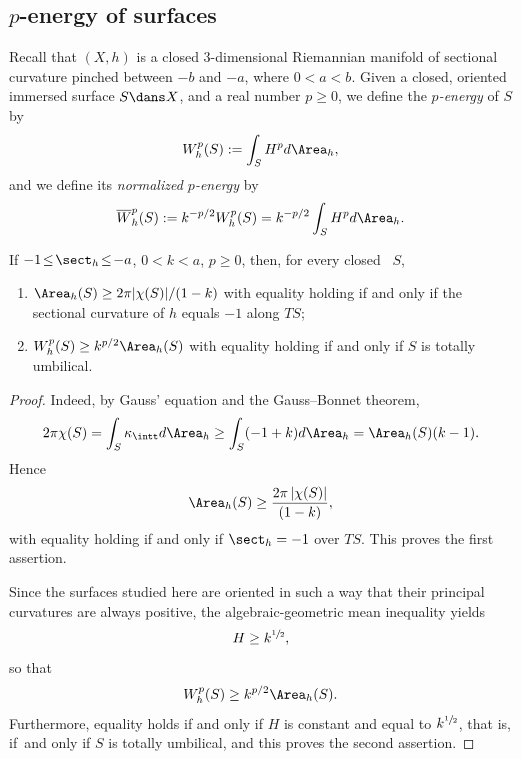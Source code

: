 \subsection{$p$-energy of surfaces} Recall that $(X,h)$ is a closed $3$\nobreakdash-dimensional Riemannian manifold of sectional curvature pinched between $-b$ and $-a$, where $0<a<b$. Given a closed, oriented immersed surface $S\dans X$, and a real number $p\geq 0$, we define the \emph{$p$-energy} of $S$ by
\begin{equation*}
W_h^{p}(S):=\int_S H^p d\Area_h,
\end{equation*}
and we define its \emph{normalized $p$-energy} by
\begin{equation*}
\overline{W}_h^{p}(S):=k^{-p/2}W_h^p(S)=k^{-p/2}\int_S H^p d\Area_h.
\end{equation*}

\begin{lemma}\label{lem_lower_bounds_energy}
If $-1\!\leq\!\sect_h\!\leq\! -a$, $0\!<\!k\!<\!a$, $p\!\geq\!0$, then, for every closed \ksurface~$S$,
\begin{enumerate}
\item $\Area_h(S)\geq 2\pi|\chi(S)|/(1-k)$ with equality holding if and only if the sectional curvature of $h$ equals $-1$ along $TS$;
\item $W_h^{p}(S)\geq k^{p/2}\Area_h(S)$ with equality holding if and only if $S$ is totally umbilical.
\end{enumerate}
\end{lemma}

\begin{proof}
Indeed, by Gauss' equation and the Gauss--Bonnet theorem,
\begin{equation*}
2 \pi \chi(S) = \int_{S} \kappa_{\intt}d\Area_h \geq \int_{S} (-1 + k)d\Area_h=\Area_h(S) (k-1).
\end{equation*}
Hence
\begin{equation*}
\Area_h(S) \geq \frac{2\pi\left|\chi(S)\right|}{(1-k)},
\end{equation*}
with equality holding if and only if $\sect_h=-1$ over $TS$. This proves the first assertion.

Since the surfaces studied here are oriented in such a way that their principal curvatures are always positive, the algebraic-geometric mean inequality yields
\begin{equation*}
H\geq k^{\sfrac{1}{2}},
\end{equation*}
so that
\begin{equation*}
W_h^p(S) \geq k^{p/2}\Area_h(S).
\end{equation*}
Furthermore, equality holds if and only if $H$ is constant and equal to $k^{\sfrac{1}{2}}$, that is, if~and only if $S$ is totally umbilical, and this proves the second assertion.
\end{proof}

